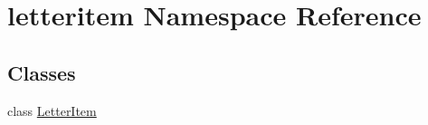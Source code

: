 \hypertarget{namespaceletteritem}{}\section{letteritem Namespace Reference}
\label{namespaceletteritem}
\subsection*{Classes}
\begin{DoxyCompactItemize}
\item 
class \hyperlink{classletteritem_1_1LetterItem}{Letter\+Item}
\end{DoxyCompactItemize}
